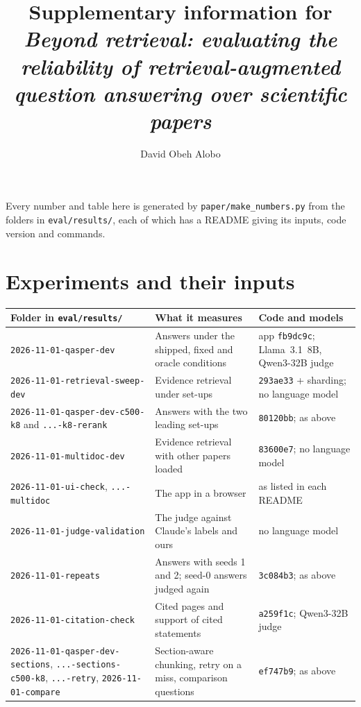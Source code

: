 \documentclass[11pt]{article}
\title{Supplementary information for\\
  \emph{Beyond retrieval: evaluating the reliability of retrieval-augmented question answering
  over scientific papers}}
\author{David Obeh Alobo}
\date{}
\begin{document}
\sloppy
\maketitle
\tableofcontents

\bigskip
\noindent Every number and table here is generated by \texttt{paper/make\_numbers.py} from the
folders in \texttt{eval/results/}, each of which has a README giving its inputs, code version and
commands.

\section{Experiments and their inputs}
\label{si:inputs}

\begin{center}
\footnotesize
\begin{tabular}{P{5.2cm}P{4.6cm}P{4.8cm}}
\toprule
Folder in \texttt{eval/results/} & What it measures & Code and models \\
\midrule
\texttt{2026-11-01-qasper-dev} & Answers under the shipped, fixed and oracle conditions & app
\texttt{fb9dc9c}; Llama~3.1~8B, Qwen3-32B judge \\
\texttt{2026-11-01-retrieval-sweep-dev} & Evidence retrieval under \SweepSetups{} set-ups &
\texttt{293ae33} + sharding; no language model \\
\texttt{2026-11-01-qasper-dev-c500-k8} and \texttt{...-k8-rerank} & Answers with the two leading set-ups
& \texttt{80120bb}; as above \\
\texttt{2026-11-01-multidoc-dev} & Evidence retrieval with other papers loaded & \texttt{83600e7};
no language model \\
\texttt{2026-11-01-ui-check}, \texttt{...-multidoc} & The app in a browser & as listed in each
README \\
\texttt{2026-11-01-judge-validation} & The judge against Claude's labels and ours & no
language model \\
\texttt{2026-11-01-repeats} & Answers with seeds 1 and 2; seed-0 answers judged again &
\texttt{3c084b3}; as above \\
\texttt{2026-11-01-citation-check} & Cited pages and support of cited statements &
\texttt{a259f1c}; Qwen3-32B judge \\
\texttt{2026-11-01-qasper-dev-sections}, \texttt{...-sections-c500-k8},
\texttt{...-retry}, \texttt{2026-11-01-compare} & Section-aware chunking, retry on a miss,
comparison questions & \texttt{ef747b9}; as above \\
\bottomrule
\end{tabular}
\end{center}
\end{document}
